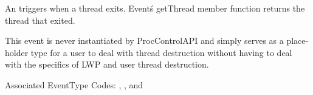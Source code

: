 
An  triggers when a thread exits. Event\'s getThread
member function returns the thread that exited.

This event is never instantiated by ProcControlAPI and simply serves as a
place-holder type for a user to deal with thread destruction without having to
deal with the specifics of LWP and user thread destruction.

Associated EventType Codes: , , and
